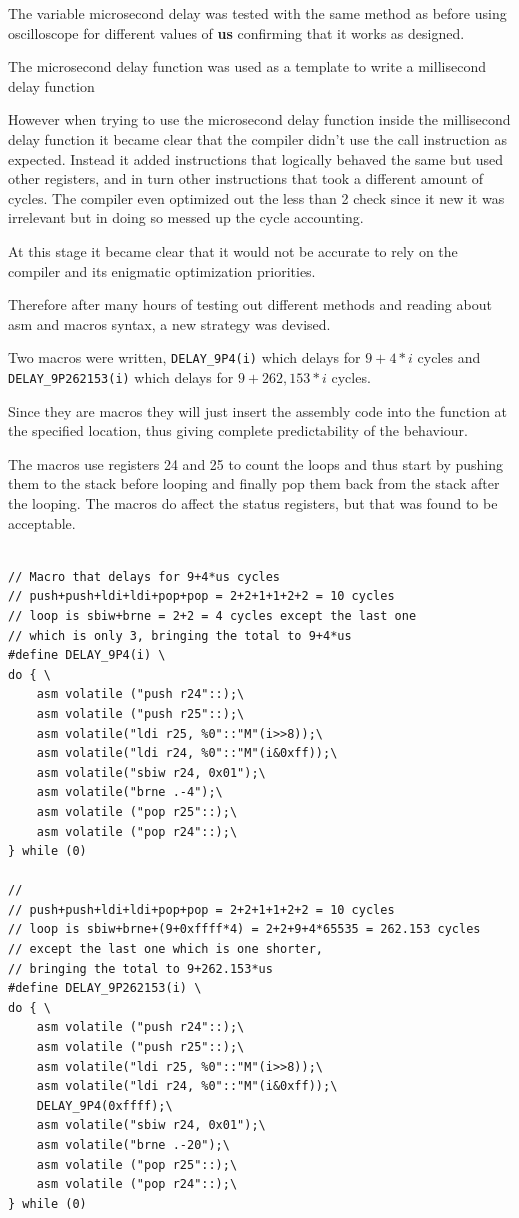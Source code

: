 \documentclass{article}
\begin{document}
The variable microsecond delay was tested with the same method as before using oscilloscope for different values of \textbf{us} confirming that it works as designed.

The microsecond delay function was used as a template to write a millisecond delay function

However when trying to use the microsecond delay function inside the millisecond delay function it became clear that the compiler didn't use the call instruction as expected. Instead it added instructions that logically behaved the same but used other registers, and in turn other instructions that took a different amount of cycles. The compiler even optimized out the less than 2 check since it new it was irrelevant but in doing so messed up the cycle accounting.

At this stage it became clear that it would not be accurate to rely on the compiler and its enigmatic optimization priorities.

Therefore after many hours of testing out different methods and reading about asm and macros syntax, a new strategy was devised.

Two macros were written, \verb"DELAY_9P4(i)" which delays for $9 + 4*i$ cycles and \verb"DELAY_9P262153(i)" which delays for $9+262,153*i$ cycles.

Since they are macros they will just insert the assembly code into the function at the specified location, thus giving complete predictability of the behaviour.

The macros use registers 24 and 25 to count the loops and thus start by pushing them to the stack before looping and finally pop them back from the stack after the looping. The macros do affect the status registers, but that was found to be acceptable.

\begin{lstlisting}
    
// Macro that delays for 9+4*us cycles
// push+push+ldi+ldi+pop+pop = 2+2+1+1+2+2 = 10 cycles
// loop is sbiw+brne = 2+2 = 4 cycles except the last one
// which is only 3, bringing the total to 9+4*us
#define DELAY_9P4(i) \
do { \
	asm volatile ("push r24"::);\
	asm volatile ("push r25"::);\
	asm volatile("ldi r25, %0"::"M"(i>>8));\
	asm volatile("ldi r24, %0"::"M"(i&0xff));\
	asm volatile("sbiw r24, 0x01");\
	asm volatile("brne .-4");\
	asm volatile ("pop r25"::);\
	asm volatile ("pop r24"::);\
} while (0)

//
// push+push+ldi+ldi+pop+pop = 2+2+1+1+2+2 = 10 cycles
// loop is sbiw+brne+(9+0xffff*4) = 2+2+9+4*65535 = 262.153 cycles
// except the last one which is one shorter,
// bringing the total to 9+262.153*us
#define DELAY_9P262153(i) \
do { \
	asm volatile ("push r24"::);\
	asm volatile ("push r25"::);\
	asm volatile("ldi r25, %0"::"M"(i>>8));\
	asm volatile("ldi r24, %0"::"M"(i&0xff));\
	DELAY_9P4(0xffff);\
	asm volatile("sbiw r24, 0x01");\
	asm volatile("brne .-20");\
	asm volatile ("pop r25"::);\
	asm volatile ("pop r24"::);\
} while (0)
\end{lstlisting}
\end{document}
